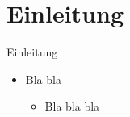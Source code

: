 \section{Einleitung}
\begin{frame}[t]{Einleitung}
	\begin{itemize}
		\item Bla bla
		\begin{itemize}
			\item Bla bla bla
		\end{itemize}
	\end{itemize}
\end{frame}
